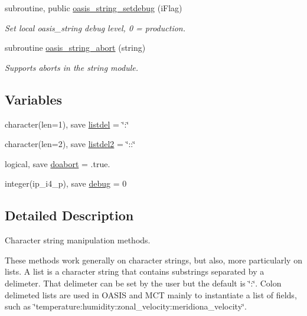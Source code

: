 \begin{DoxyCompactItemize}
subroutine, public \hyperlink{namespacemod__oasis__string_af5c49843654a2bc9ccedf2934571329d}{oasis\+\_\+string\+\_\+setdebug} (i\+Flag)
\begin{DoxyCompactList}\small\item\em Set local oasis\+\_\+string debug level, 0 = production. \end{DoxyCompactList}\item 
subroutine \hyperlink{namespacemod__oasis__string_a86c2c26b793c41219bc833beb992d0e3}{oasis\+\_\+string\+\_\+abort} (string)
\begin{DoxyCompactList}\small\item\em Supports aborts in the string module. \end{DoxyCompactList}\end{DoxyCompactItemize}
\subsection*{Variables}
\begin{DoxyCompactItemize}
\item 
character(len=1), save \hyperlink{namespacemod__oasis__string_aa6f905efb4869a52d8bb2414e82bb0a7}{listdel} = \char`\"{}\+:\char`\"{}
\item 
character(len=2), save \hyperlink{namespacemod__oasis__string_a9b40ad6f4785bd4765a24b6337185513}{listdel2} = \char`\"{}\+::\char`\"{}
\item 
logical, save \hyperlink{namespacemod__oasis__string_a59e9b1145c7c14506941e6495b237395}{doabort} = .true.
\item 
integer(ip\+\_\+i4\+\_\+p), save \hyperlink{namespacemod__oasis__string_a84408befb8bedabf75507eb4d690cea9}{debug} = 0
\end{DoxyCompactItemize}


\subsection{Detailed Description}
Character string manipulation methods. 

These methods work generally on character strings, but also, more particularly on lists. A list is a character string that contains substrings separated by a delimeter. That delimeter can be set by the user but the default is \char`\"{}\+:\char`\"{}. Colon delimeted lists are used in O\+A\+S\+IS and M\+CT mainly to instantiate a list of fields, such as \char`\"{}temperature\+:humidity\+:zonal\+\_\+velocity\+:meridiona\+\_\+velocity\char`\"{}. 

